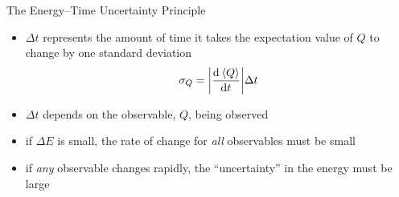 \documentclass[ignorenonframetext,]{beamer}
\begin{document}
\begin{frame}{The Energy--Time Uncertainty Principle}

\begin{itemize}
\itemsep1pt\parskip0pt
\item
  \(\Delta t\) represents the amount of time it takes the expectation
  value of \(Q\) to change by one standard deviation
  \[\sigma_Q = \abs{\dod{\expval*{Q}}{t}} \Delta t\]
\item
  \(\Delta t\) depends on the observable, \(Q\), being observed
\item
  if \(\Delta E\) is small, the rate of change for \emph{all}
  observables must be small
\item
  if \emph{any} observable changes rapidly, the ``uncertainty'' in the
  energy must be large
\end{itemize}

\end{frame}
\end{document}
